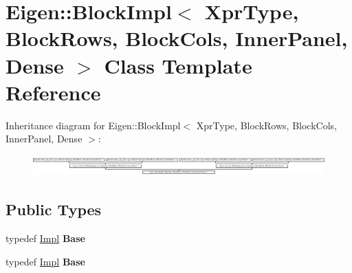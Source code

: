 \hypertarget{class_eigen_1_1_block_impl_3_01_xpr_type_00_01_block_rows_00_01_block_cols_00_01_inner_panel_00_01_dense_01_4}{}\section{Eigen\+:\+:Block\+Impl$<$ Xpr\+Type, Block\+Rows, Block\+Cols, Inner\+Panel, Dense $>$ Class Template Reference}
\label{class_eigen_1_1_block_impl_3_01_xpr_type_00_01_block_rows_00_01_block_cols_00_01_inner_panel_00_01_dense_01_4}
Inheritance diagram for Eigen\+:\+:Block\+Impl$<$ Xpr\+Type, Block\+Rows, Block\+Cols, Inner\+Panel, Dense $>$\+:\begin{figure}[H]
\begin{center}
\leavevmode
\includegraphics[height=0.801527cm]{class_eigen_1_1_block_impl_3_01_xpr_type_00_01_block_rows_00_01_block_cols_00_01_inner_panel_00_01_dense_01_4}
\end{center}
\end{figure}
\subsection*{Public Types}
\begin{DoxyCompactItemize}
\item 
\mbox{\label{class_eigen_1_1_block_impl_3_01_xpr_type_00_01_block_rows_00_01_block_cols_00_01_inner_panel_00_01_dense_01_4_a6343ad315fba432c3ccfccbcae23de9b}} 
typedef \hyperlink{class_eigen_1_1internal_1_1_block_impl__dense}{Impl} {\bfseries Base}
\item 
\mbox{\label{class_eigen_1_1_block_impl_3_01_xpr_type_00_01_block_rows_00_01_block_cols_00_01_inner_panel_00_01_dense_01_4_a6343ad315fba432c3ccfccbcae23de9b}} 
typedef \hyperlink{class_eigen_1_1internal_1_1_block_impl__dense}{Impl} {\bfseries Base}
\end{DoxyCompactItemize}
